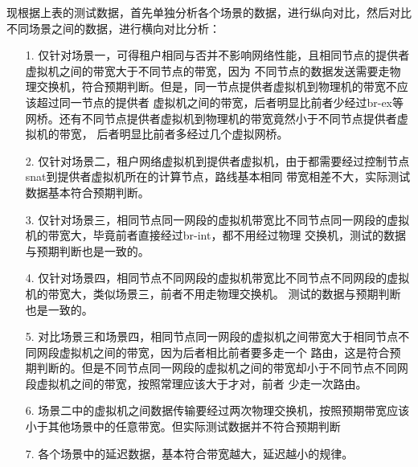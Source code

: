 \documentclass[a4paper,left=1.5cm,right=1.5cm,11pt]{article}
\begin{document}
现根据上表的测试数据，首先单独分析各个场景的数据，进行纵向对比，然后对比不同场景之间的数据，进行横向对比分析：\\
\begin{itemize}
	\item[1.]仅针对场景一，可得租户相同与否并不影响网络性能，且相同节点的提供者虚拟机之间的带宽大于不同节点的带宽，因为
	不同节点的数据发送需要走物理交换机，符合预期判断。但是，同一节点提供者虚拟机到物理机的带宽不应该超过同一节点的提供者
	虚拟机之间的带宽，后者明显比前者少经过br-ex等网桥。还有不同节点提供者虚拟机到物理机的带宽竟然小于不同节点提供者虚拟机的带宽，
	后者明显比前者多经过几个虚拟网桥。
	\item[2.]仅针对场景二，租户网络虚拟机到提供者虚拟机，由于都需要经过控制节点snat到提供者虚拟机所在的计算节点，路线基本相同
	带宽相差不大，实际测试数据基本符合预期判断。
	\item[3.]仅针对场景三，相同节点同一网段的虚拟机带宽比不同节点同一网段的虚拟机的带宽大，毕竟前者直接经过br-int，都不用经过物理
	交换机，测试的数据与预期判断也是一致的。
	\item[4.]仅针对场景四，相同节点不同网段的虚拟机带宽比不同节点不同网段的虚拟机的带宽大，类似场景三，前者不用走物理交换机。
	测试的数据与预期判断也是一致的。
	\item[5.]对比场景三和场景四，相同节点同一网段的虚拟机之间带宽大于相同节点不同网段虚拟机之间的带宽，因为后者相比前者要多走一个
	路由，这是符合预期判断的。但是不同节点同一网段的虚拟机之间的带宽却小于不同节点不同网段虚拟机之间的带宽，按照常理应该大于才对，前者
	少走一次路由。
	\item[6.]场景二中的虚拟机之间数据传输要经过两次物理交换机，按照预期带宽应该小于其他场景中的任意带宽。但实际测试数据并不符合预期判断
	\item[7.]各个场景中的延迟数据，基本符合带宽越大，延迟越小的规律。
\end{itemize}
\end{document}
